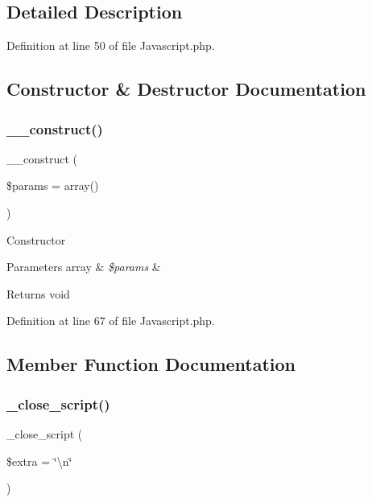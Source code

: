 \subsection{Detailed Description}


Definition at line 50 of file Javascript.\+php.



\subsection{Constructor \& Destructor Documentation}
\mbox{\label{class_c_i___javascript_a568ecdb0d73d2a870f33189739922a50}} 
\subsubsection{\texorpdfstring{\_\_construct()}{\_\_construct()}}
{\footnotesize\ttfamily \+\_\+\+\_\+construct (\begin{DoxyParamCaption}\item[{}]{\$params = {\ttfamily array()} }\end{DoxyParamCaption})}

Constructor


\begin{DoxyParams}[1]{Parameters}
array & {\em \$params} & \\
\hline
\end{DoxyParams}
\begin{DoxyReturn}{Returns}
void 
\end{DoxyReturn}


Definition at line 67 of file Javascript.\+php.



\subsection{Member Function Documentation}
\mbox{\label{class_c_i___javascript_a83a39b1edd6e0ec9bd6c93de99a0d4d8}} 
\subsubsection{\texorpdfstring{\_close\_script()}{\_close\_script()}}
{\footnotesize\ttfamily \+\_\+close\+\_\+script (\begin{DoxyParamCaption}\item[{}]{\$extra = {\ttfamily \char`\"{}\textbackslash{}n\char`\"{}} }\end{DoxyParamCaption})\hspace{0.3cm}{\ttfamily [protected]}}

